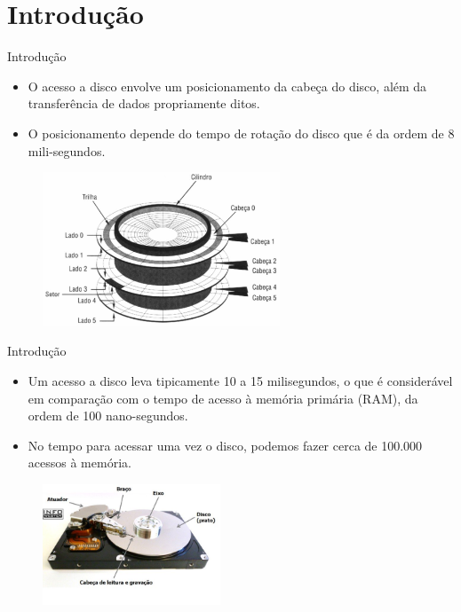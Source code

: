 \documentclass[aspectratio=169]{beamer}
\begin{document}
\section{Introdução}

\begin{frame}{Introdução}
\begin{itemize}
 \item O acesso a disco envolve um posicionamento da cabeça do disco, além da transferência de dados propriamente ditos. 
 \item O posicionamento depende do tempo de rotação do disco que é da ordem de 8 mili-segundos. 
\end{itemize} 
\begin{figure}[!h]
  \centering
   \includegraphics[width=200pt]{imagens/disco_rigido1.jpg}
  \label{fig_disco_rigido1}
\end{figure} 
\end{frame}


\begin{frame}{Introdução}
\begin{itemize}
 \item Um acesso a disco leva tipicamente 10 a 15 milisegundos, o que é considerável em comparação com o tempo de acesso à memória primária (RAM), da ordem de 100 nano-segundos. 
 \item No tempo para acessar uma vez o disco, podemos fazer cerca de 100.000 acessos à memória.
\end{itemize}
\begin{figure}[!h]
  \centering
   \includegraphics[width=150pt]{imagens/disco_rigido2.png}
  \label{fig_disco_rigido2}
\end{figure} 
\end{frame}
\end{document}
